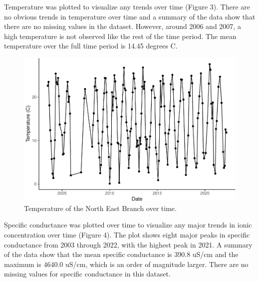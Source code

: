 \documentclass[
  12pt,
]{article}
\begin{document}
\newpage

Temperature was plotted to visualize any trends over time (Figure 3).
There are no obvious trends in temperature over time and a summary of
the data show that there are no missing values in the dataset. However,
around 2006 and 2007, a high temperature is not observed like the rest
of the time period. The mean temperature over the full time period is
14.45 degrees C.

\begin{figure}

\includegraphics{Project_Template_files/figure-latex/Temperature over time-1} \hfill{}

\caption{Temperature of the North East Branch over time.}\label{fig:Temperature over time}
\end{figure}

\newpage

Specific conductance was plotted over time to visualize any major trends
in ionic concentration over time (Figure 4). The plot shows eight major
peaks in specific conductance from 2003 through 2022, with the highest
peak in 2021. A summary of the data show that the mean specific
conductance is 390.8 uS/cm and the maximum is 4640.0 uS/cm, which is an
order of magnitude larger. There are no missing values for specific
conductance in this dataset.
\end{document}
